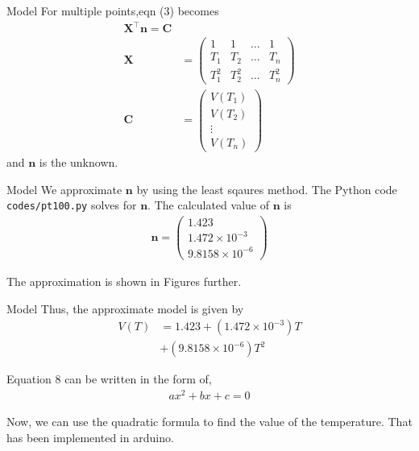 \documentclass{beamer}
\providecommand{\brak}[1]{\ensuremath{\left(#1\right)}}
\theoremstyle{remark}
\newcommand{\myvec}[1]{\ensuremath{\begin{pmatrix}#1\end{pmatrix}}}
\renewcommand{\vec}[1]{\mathbf{\boldsymbol{#1}}}
\begin{document}
\begin{frame}{Model}
    For multiple points,eqn (3) becomes
    \begin{align}
        \vec{X}^\top\vec{n} = \vec{C}                   \\
        \vec{X} & = \myvec{1           & 1 & \ldots & 1 \\T_1&T_2&\ldots&T_n\\T_1^2&T_2^2&\ldots&T_n^2} \\
        \vec{C} & = \myvec{V\brak{T_1}                  \\V\brak{T_2}\\\vdots\\V\brak{T_n}}
    \end{align}
    and $\vec{n}$ is the unknown.
\end{frame}

\begin{frame}{Model}
    We approximate $\vec{n}$ by using the least sqaures method. The Python code
    \texttt{codes/pt100.py} solves for $\vec{n}$.
    The calculated value of $\vec{n}$ is
    \begin{align}
        \vec{n} = \myvec{1.423 \\1.472\times10^{-3}\\9.8158\times10^{-6}}
    \end{align}

    The approximation is shown in Figures further.
\end{frame}

\begin{frame}{Model}
Thus, the approximate model is given by
\begin{align}
    V(T) & = 1.423 + \brak{1.472\times10^{-3}}T \nonumber \\
         & + \brak{9.8158\times10^{-6}}T^2
\end{align}

Equation 8 can be written in the form of,
\begin{align}
    ax^2 + bx + c=0 
\end{align}

Now, we can use the quadratic formula to find the value of the temperature.
That has been implemented in arduino.

\end{frame}
\end{document}

